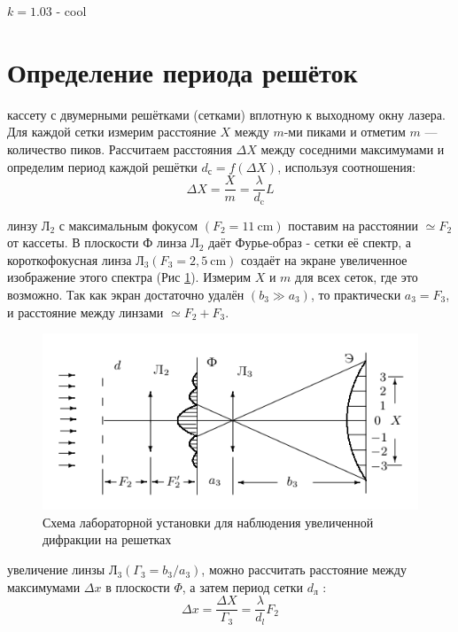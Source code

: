 \documentclass[a4paper, 12pt]{article}
\begin{document}
 $k = 1.03$ - cool
    

\section*{Определение периода решёток}

\begin{enumerate}
     кассету с двумерными решётками (сетками) вплотную к выходному окну лазера. Для каждой сетки измерим расстояние $X$ между $m$-ми пиками и отметим $m$ — количество пиков. Рассчитаем расстояния $\Delta X$ между соседними максимумами и определим период каждой решётки $d_с = f(\Delta X)$, используя соотношения:
        \begin{equation*}
            \Delta X=\frac{X}{m}=\frac{\lambda}{d_{\mathrm{c}}} L
        \end{equation*}
    
         линзу Л$_{2}$ с максимальным фокусом $\left(F_{2} = 11 \mathrm{~cm}\right)$ поставим на расстоянии $\simeq F_{2}$ от кассеты. В плоскости Ф линза Л$_{2}$ даёт Фурье-образ - сетки её спектр, а короткофокусная линза Л$_{3}\left(F_{3} = 2,5 \mathrm{~cm}\right)$ создаёт на экране увеличенное изображение этого спектра (Рис \ref{fig:scheme_III}).
        Измерим $X$ и $m$ для всех сеток, где это возможно. Так как экран достаточно удалён $\left(b_{3} \gg a_{3}\right)$, то практически $a_{3}=F_{3}$, и расстояние между линзами $\simeq F_{2}+F_{3} .$
        
        \begin{figure}[h]
            \centering
            \includegraphics[width=15cm]{scheme_III.png}
            \caption{Схема лабораторной установки для наблюдения увеличенной дифракции на решетках}
            \label{fig:scheme_III}
        \end{figure}

         увеличение линзы ${Л_{3}}\left(\Gamma_{3}=b_{3} / a_{3}\right)$, можно рассчитать расстояние между максимумами $\Delta x$ в плоскости $\Phi$, а затем период сетки $d_{л}$ :
        $$
        \Delta x=\frac{\Delta X}{\Gamma_{3}}=\frac{\lambda}{d_{l}} F_{2}
        $$
\end{enumerate}
\end{document}
